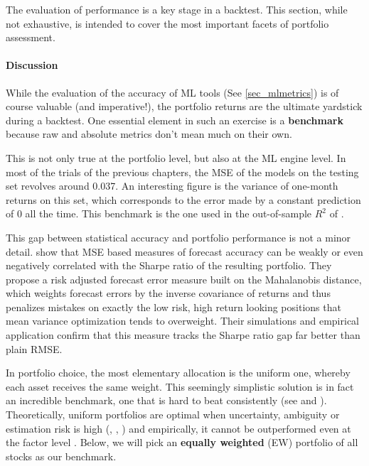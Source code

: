 The evaluation of performance is a key stage in a backtest. This section, while not exhaustive, is intended to cover the most important facets of portfolio assessment.

\paragraph{Discussion}

While the evaluation of the accuracy of ML tools (See \ref{sec_mlmetrics}) is of course valuable (and imperative!), the portfolio returns are the ultimate yardstick during a backtest. One essential element in such an exercise is a \textbf{benchmark} because raw and absolute metrics don't mean much on their own.

This is not only true at the portfolio level, but also at the ML engine level. In most of the trials of the previous chapters, the MSE of the models on the testing set revolves around 0.037. An interesting figure is the variance of one-month returns on this set, which corresponds to the error made by a constant prediction of 0 all the time. This benchmark is the one used in the out-of-sample $R^2$ of \cite{gu2018empirical}.

This gap between statistical accuracy and portfolio performance is not a minor detail. \cite{salcher2026lost} show that MSE based measures of forecast accuracy can be weakly or even negatively correlated with the Sharpe ratio of the resulting portfolio. They propose a risk adjusted forecast error measure built on the Mahalanobis distance, which weights forecast errors by the inverse covariance of returns and thus penalizes mistakes on exactly the low risk, high return looking positions that mean variance optimization tends to overweight. Their simulations and empirical application confirm that this measure tracks the Sharpe ratio gap far better than plain RMSE.

In portfolio choice, the most elementary allocation is the uniform one, whereby each asset receives the same weight. This seemingly simplistic solution is in fact an incredible benchmark, one that is hard to beat consistently (see \cite{demiguel2007optimal} and \cite{plyakha2014equal}). Theoretically, uniform portfolios are optimal when uncertainty, ambiguity or estimation risk is high (\cite{pflug20121}, \cite{maillet2015global}, \cite{zhao2021efficient}) and empirically, it cannot be outperformed even at the factor level \citep{dichtl2020build}. Below, we will pick an \textbf{equally weighted} (EW) portfolio of all stocks as our benchmark.

